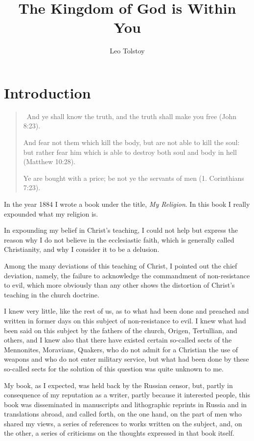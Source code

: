 \documentclass{book}
\date{}
\title{The Kingdom of God is Within You}
\author{Leo Tolstoy}
\begin{document}
\setcounter{tocdepth}{0}
\setcounter{secnumdepth}{0}

\chapter*{Introduction}
\label{chapter-0}
\begin{quotation}\
	And ye shall know the truth, and the truth shall make you free (John 8:23).

	And fear not them which kill the body, but are not able to kill the soul: but rather fear him which is able to destroy both soul and body in hell (Matthew 10:28).

	Ye are bought with a price; be not ye the servants of men (1. Corinthians 7:23).
\end{quotation}

In the year 1884 I wrote a book under the title, \emph{My Religion}. In this book I really expounded what my religion is.

In expounding my belief in Christ’s teaching, I could not help but express the reason why I do not believe in the ecclesiastic faith, which is generally called Christianity, and why I consider it to be a delusion.

Among the many deviations of this teaching of Christ, I pointed out the chief deviation, namely, the failure to acknowledge the commandment of non-resistance to evil, which more obviously than any other shows the distortion of Christ’s teaching in the church doctrine.

I knew very little, like the rest of us, as to what had been done and preached and written in former days on this subject of non-resistance to evil. I knew what had been said on this subject by the fathers of the church, Origen, Tertullian, and others, and I knew also that there have existed certain so-called sects of the Mennonites, Moravians, Quakers, who do not admit for a Christian the use of weapons and who do not enter military service, but what had been done by these so-called sects for the solution of this question was quite unknown to me.

My book, as I expected, was held back by the Russian censor, but, partly in consequence of my reputation as a writer, partly because it interested people, this book was disseminated in manuscripts and lithographic reprints in Russia and in translations abroad, and called forth, on the one hand, on the part of men who shared my views, a series of references to works written on the subject, and, on the other, a series of criticisms on the thoughts expressed in that book itself.
\end{document}
